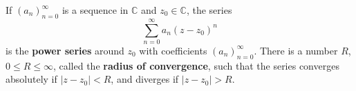 If $(a_n)_{n=0}^{\infty}$ is a sequence in $\mathbb{C}$ and $z_0 \in \mathbb{C}$, the series
$$\sum_{n=0}^{\infty} a_n (z - z_0)^n$$
is the \textbf{power series} around $z_0$ with coefficients $(a_n)_{n=0}^{\infty}$. There is a number $R$, $0 \leq R \leq \infty$, called the \textbf{radius of convergence}, such that the series converges absolutely if $|z - z_0| < R$, and diverges if $|z - z_0| > R$.
